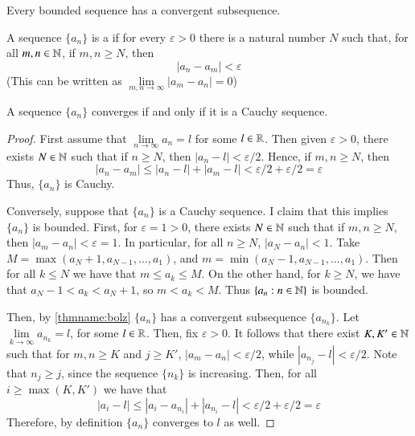 \begin{cor}\label{cor:bolz}
    Every bounded sequence has a convergent subsequence.
\end{cor}


\begin{defn}
    A sequence $\{a_n\}$ is a  if for every $\varepsilon > 0$ there is a natural number $N$ such that, for all $m,n \in \mathbb N$, if $m,n \geq N$, then \begin{equation*}
        |a_n-a_m| <\varepsilon
    \end{equation*}
    (This can be written as $\lim\limits_{m,n\rightarrow \infty}|a_m-a_n| = 0$)
\end{defn}


\begin{thm}
    A sequence $\{a_n\}$ converges if and only if it is a Cauchy sequence.
\end{thm}
\begin{proof}
    First assume that $\lim\limits_{n\rightarrow \infty}a_n = l$ for some $l \in \mathbb R$. Then given $\varepsilon > 0$, there exists $N \in \mathbb N$ such that if $n \geq N$, then $|a_n - l| < \varepsilon/2$. Hence, if $m,n \geq N$, then $$|a_n - a_m| \leq |a_n - l| + |a_m-l| < \varepsilon/2+\varepsilon/2 = \varepsilon$$
    Thus, $\{a_n\}$ is Cauchy.

    Conversely, suppose that $\{a_n\}$ is a Cauchy sequence. I claim that this implies $\{a_n\}$ is bounded. First, for $\varepsilon = 1 > 0$, there exists $N \in \mathbb N$ such that if $m,n \geq N$, then $|a_m-a_n| < \varepsilon = 1$. In particular, for all $n \geq N$, $|a_N - a_n| < 1$. Take $M = \max(a_N + 1, a_{N-1},...,a_1)$, and $m = \min(a_N - 1, a_{N-1},...,a_1)$. Then for all $k \leq N$ we have that $m \leq a_k \leq M$. On the other hand, for $k \geq N$, we have that $a_N - 1 < a_k < a_N + 1$, so $m < a_k < M$. Thus $\{a_n:n \in \mathbb N\}$ is bounded. 

    Then, by \ref{thmname:bolz} $\{a_n\}$ has a convergent subsequence $\{a_{n_k}\}$. Let $\lim\limits_{k\rightarrow \infty}a_{n_k} = l$, for some $l \in \mathbb R$. Then, fix $\varepsilon > 0$. It follows that there exist $K, K' \in \mathbb N$ such that for $m,n \geq K$ and $j \geq K'$, $|a_m - a_n| < \varepsilon/2$, while $|a_{n_j} - l| < \varepsilon/2$. Note that $n_j \geq j$, since the sequence $\{n_k\}$ is increasing. Then, for all $i \geq \max(K,K')$ we have that \begin{equation*}
        |a_i - l| \leq |a_i - a_{n_i}| + |a_{n_i} - l| < \varepsilon/2 + \varepsilon/2 = \varepsilon
    \end{equation*}
    Therefore, by definition $\{a_n\}$ converges to $l$ as well.
\end{proof}



